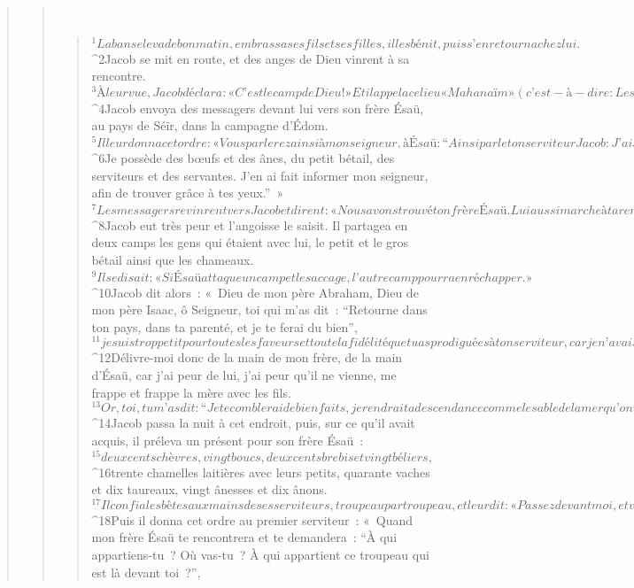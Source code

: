 \begin{verse}
\begin{verse}
         
      \bchapter{}
      \begin{verse}
${}^{1}Laban se leva de bon matin, embrassa ses fils et ses filles, il les bénit, puis s’en retourna chez lui. 
${}^{2}Jacob se mit en route, et des anges de Dieu vinrent à sa rencontre. 
${}^{3}À leur vue, Jacob déclara : « C’est le camp de Dieu ! » Et il appela ce lieu « Mahanaïm » (c’est-à-dire : Les deux camps).
      
         
${}^{4}Jacob envoya des messagers devant lui vers son frère Ésaü, au pays de Séïr, dans la campagne d’Édom. 
${}^{5}Il leur donna cet ordre : « Vous parlerez ainsi à mon seigneur, à Ésaü : “Ainsi parle ton serviteur Jacob : J’ai séjourné chez Laban comme un immigré et j’y suis resté jusqu’à présent. 
${}^{6}Je possède des bœufs et des ânes, du petit bétail, des serviteurs et des servantes. J’en ai fait informer mon seigneur, afin de trouver grâce à tes yeux.” »
${}^{7}Les messagers revinrent vers Jacob et dirent : « Nous avons trouvé ton frère Ésaü. Lui aussi marche à ta rencontre et, avec lui, quatre cents hommes. »
${}^{8}Jacob eut très peur et l’angoisse le saisit. Il partagea en deux camps les gens qui étaient avec lui, le petit et le gros bétail ainsi que les chameaux. 
${}^{9}Il se disait : « Si Ésaü attaque un camp et le saccage, l’autre camp pourra en réchapper. »
${}^{10}Jacob dit alors : « Dieu de mon père Abraham, Dieu de mon père Isaac, ô Seigneur, toi qui m’as dit : “Retourne dans ton pays, dans ta parenté, et je te ferai du bien”, 
${}^{11}je suis trop petit pour toutes les faveurs et toute la fidélité que tu as prodiguées à ton serviteur, car je n’avais que mon bâton quand j’ai traversé ce Jourdain, et maintenant je suis à la tête de deux camps. 
${}^{12}Délivre-moi donc de la main de mon frère, de la main d’Ésaü, car j’ai peur de lui, j’ai peur qu’il ne vienne, me frappe et frappe la mère avec les fils. 
${}^{13}Or, toi, tu m’as dit : “Je te comblerai de bienfaits, je rendrai ta descendance comme le sable de la mer qu’on ne peut dénombrer, tant il y en a !” »
${}^{14}Jacob passa la nuit à cet endroit, puis, sur ce qu’il avait acquis, il préleva un présent pour son frère Ésaü : 
${}^{15}deux cents chèvres, vingt boucs, deux cents brebis et vingt béliers, 
${}^{16}trente chamelles laitières avec leurs petits, quarante vaches et dix taureaux, vingt ânesses et dix ânons. 
${}^{17}Il confia les bêtes aux mains de ses serviteurs, troupeau par troupeau, et leur dit : « Passez devant moi, et vous laisserez un espace entre chaque troupeau. » 
${}^{18}Puis il donna cet ordre au premier serviteur : « Quand mon frère Ésaü te rencontrera et te demandera : “À qui appartiens-tu ? Où vas-tu ? À qui appartient ce troupeau qui est là devant toi ?”, 

\end{verse}
\end{verse}
\end{verse}

